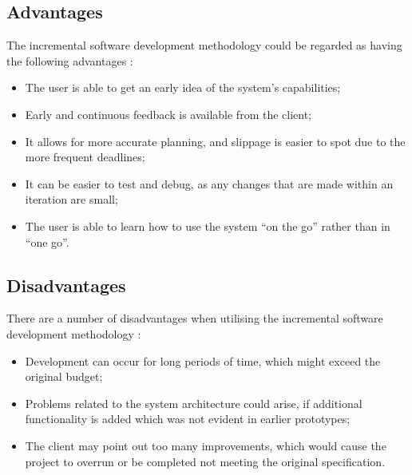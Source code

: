\subsection{Advantages}
The incremental software development methodology could be regarded as having 
the following advantages \citep{elliott04,SDT:2012:Online}:
\begin{itemize}
	\item The user is able to get an early idea of the system's capabilities;
	\item Early and continuous feedback is available from the client;
	\item It allows for more accurate planning, and slippage is easier to spot 
        due to the more frequent deadlines;
	\item It can be easier to test and debug, as any changes that are made within 
        an iteration are small;
	\item The user is able to learn how to use the system ``on the go'' rather 
        than in ``one go''.
\end{itemize}

\subsection{Disadvantages}
There are a number of disadvantages when utilising the incremental software 
development methodology \citep{elliott04,sergei:2012:Online}:
\begin{itemize}
	\item Development can occur for long periods of time, which might exceed the 
        original budget;
	\item Problems related to the system architecture could arise, if additional 
        functionality is added which was not 
				evident in earlier prototypes;
	\item The client may point out too many improvements, which would cause the 
        project to overrun or be completed not meeting the original 
        specification.
\end{itemize}